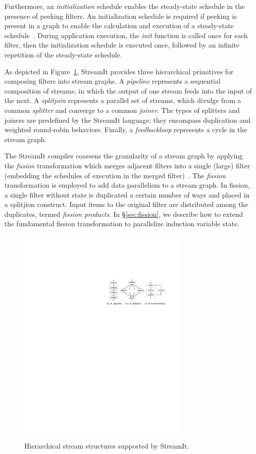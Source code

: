 Furthermore, an {\it initialization} schedule enables the steady-state
schedule in the presence of peeking filters.  An initialization
schedule is required if peeking is present in a graph to enable the
calculation and execution of a steady-state
schedule~\cite{karczmarek-lctes03}.  During application execution, the
{\it init} function is called once for each filter, then the
initialization schedule is executed once, followed by an infinite
repetition of the steady-state schedule.

As depicted in Figure~\ref{fig:structures}, StreamIt provides three
hierarchical primitives for composing filters into stream graphs.  A
{\it pipeline} represents a sequential composition of streams, in
which the output of one stream feeds into the input of the next.  A
{\it splitjoin} represents a parallel set of streams, which divulge
from a common {\it splitter} and converge to a common {\it joiner}.
The types of splitters and joiners are predefined by the StreamIt
language; they encompass duplication and weighted round-robin
behaviors.  Finally, a {\it feedbackloop} represents a cycle in the
stream graph.

The StreamIt compiler coarsens the granularity of a stream graph by
applying the {\it fusion} transformation which merges adjacent filters
into a single (large) filter (embedding the schedules of execution in
the merged filter)~\cite{streamit-asplos}.  The {\it fission}
transformation is employed to add data parallelism to a stream graph.
In fission, a single filter without state is duplicated a certain
number of ways and placed in a splitjion construct.  Input items to
the original filter are distributed among the duplicates, termed {\it
  fission products}.  In \S\ref{sec:fission}, we describe how to
extend the fundamental fission transformation to parallelize induction
variable state.

\begin{figure}[t!]
\centering
\includegraphics[width=3.3in]{stream-structures.pdf}
\caption{Hierarchical stream structures supported by StreamIt.\protect\label{fig:structures}}
\end{figure}

